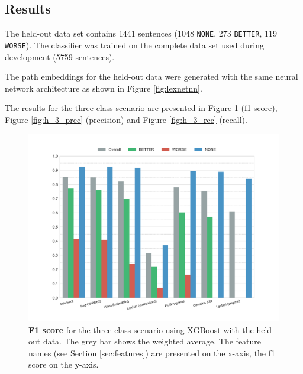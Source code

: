 \subsection{Results}
\label{sec:final}

The held-out data set contains 1441 sentences (1048 \texttt{NONE}, 273 \texttt{BETTER}, 119 \texttt{WORSE}). The classifier was trained on the complete data set used during development (5759 sentences).

The path embeddings for the held-out data were generated with the same neural network architecture as shown in Figure \ref{fig:lexnetnn}.

The results for the three-class scenario are presented in Figure \ref{fig:h_3_f1} (f1 score), Figure \ref{fig:h_3_prec} (precision) and Figure \ref{fig:h_3_rec} (recall).


\begin{figure}[htbp]
         \caption{\textbf{F1 score} for the three-class scenario using XGBoost with the held-out data. The grey bar shows the weighted average. The feature names (see Section \ref{sec:features}) are presented on the x-axis, the f1 score on the y-axis.} 
    \label{fig:h_3_f1}
    \centering
	\includegraphics[width=1\linewidth]{images/heldout/h-f1-False}
    \end{figure}
    


